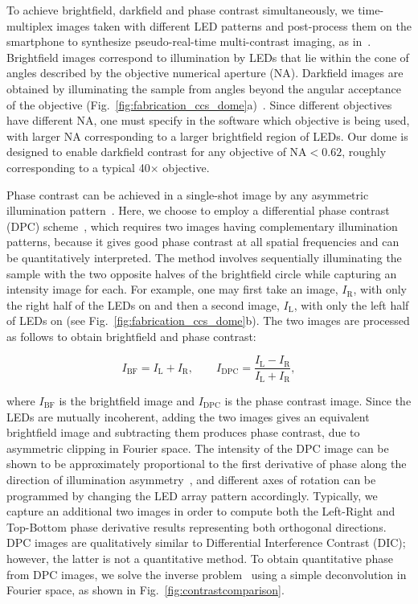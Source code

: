 To achieve brightfield, darkfield and phase contrast simultaneously, we time-multiplex images taken with different LED patterns and post-process them on the smartphone to synthesize pseudo-real-time multi-contrast imaging, as in~\cite{zijiMulti}. Brightfield images correspond to illumination by LEDs that lie within the cone of angles described by the objective numerical aperture (NA). Darkfield images are obtained by illuminating the sample from angles beyond the angular acceptance of the objective (Fig.~\ref{fig:fabrication_ccs_dome}a)~\cite{Zheng2011}. Since different objectives have different NA, one must specify in the software which objective is being used, with larger NA corresponding to a larger brightfield region of LEDs. Our dome is designed to enable darkfield contrast for any objective of NA$<0.62$, roughly corresponding to a typical 40$\times$ objective.

Phase contrast can be achieved in a single-shot image by any asymmetric illumination pattern~\cite{kachar1985asymmetric,Dodt01101999}. Here, we choose to employ a differential phase contrast (DPC) scheme~\cite{Hamilton1984a,mehta2009quantitative,Tian14,ford2012phase}, which requires two images having complementary illumination patterns, because it gives good phase contrast at all spatial frequencies and can be quantitatively interpreted. The method involves sequentially illuminating the sample with the two opposite halves of the brightfield circle while capturing an intensity image for each. For example, one may first take an image, $I_\mathrm{R}$, with only the right half of the LEDs on and then a second image, $I_\mathrm{L}$, with only the left half of LEDs on (see Fig.~\ref{fig:fabrication_ccs_dome}b). The two images are processed as follows to obtain brightfield and phase contrast:

\begin{equation}
I_{\mathrm{BF}}=I_\mathrm{L}+I_\mathrm{R}, \qquad I_{\mathrm{DPC}}= \frac{I_\mathrm{L}-I_\mathrm{R}}{I_\mathrm{L}+I_\mathrm{R}},
\label{IBF}
\end{equation}

\noindent where $I_{\mathrm{BF}}$ is the brightfield image and $I_{\mathrm{DPC}}$ is the phase contrast image. Since the LEDs are mutually incoherent, adding the two images gives an equivalent brightfield image and subtracting them produces phase contrast, due to asymmetric clipping in Fourier space. The intensity of the DPC image can be shown to be approximately proportional to the first derivative of phase along the direction of illumination asymmetry~\cite{Hamilton1984a}, and different axes of rotation can be programmed by changing the LED array pattern accordingly. Typically, we capture an additional two images in order to compute both the Left-Right and Top-Bottom phase derivative results representing both orthogonal directions. DPC images are qualitatively similar to Differential Interference Contrast (DIC); however, the latter is not a quantitative method. To obtain quantitative phase from DPC images, we solve the inverse problem~\cite{mehta2009quantitative,tian20153d} using a simple deconvolution in Fourier space, as shown in Fig.~\ref{fig:contrastcomparison}.

